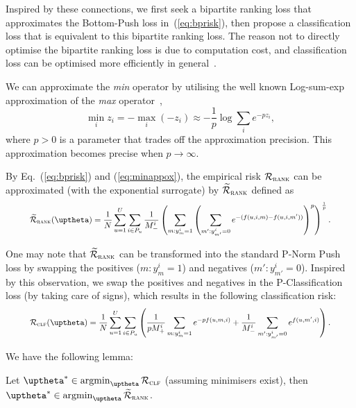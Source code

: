 Inspired by these connections, we first seek a bipartite ranking loss that approximates the Bottom-Push loss in~(\ref{eq:bprisk}),
then propose a classification loss that is equivalent to this bipartite ranking loss.
The reason not to directly optimise the bipartite ranking loss is due to computation cost,
and classification loss can be optimised more efficiently in general~\cite{ertekin2011equivalence}.

We can approximate the \emph{min} operator by utilising the well known Log-sum-exp approximation 
of the \emph{max} operator~\cite[p. 72]{boyd2004convex},
\begin{equation}
\label{eq:minappox}
\min_i z_i = -\max_i (-z_i) \approx -\frac{1}{p} \log \sum_i e^{-p z_i},
\end{equation}
where $p > 0$ is a parameter that trades off the approximation precision.
This approximation becomes precise when $p \to \infty$.

By Eq.~(\ref{eq:bprisk}) and (\ref{eq:minappox}), the empirical risk $\mathcal{R}_\textsc{rank}$ can be approximated
(with the exponential surrogate) by $\widetilde{\mathcal{R}}_\textsc{rank}$ defined as
\begin{equation}
\label{eq:rankapprox}
\resizebox{.9\linewidth}{!}{$
\begin{aligned}
\widetilde\RCal_\textsc{rank}(\uptheta)
= \frac{1}{N} \sum_{u=1}^U \sum_{i \in P_u} \frac{1}{M_-^i} \left( \sum_{m: y_m^i = 1} \left( \sum_{m': y_{m'}^i = 0} 
  e^{-(f(u, i, m) - f(u, i, m'))} \right)^p \right)^\frac{1}{p}.
\end{aligned}
$}
\end{equation}


One may note that $\widetilde{\mathcal{R}}_\textsc{rank}$ can be transformed into the standard P-Norm Push loss by swapping the
positives ($m: y_m^i = 1$) and negatives ($m': y_{m'}^i = 0$). %
Inspired by this observation, we swap the positives and negatives in the P-Classification loss (by taking care of signs),
which results in the following classification risk:
\begin{equation}
\label{eq:clfrisk}
\resizebox{.9\linewidth}{!}{$\displaystyle
\RCal_\textsc{clf}(\uptheta)
= \frac{1}{N} \sum_{u=1}^U \sum_{i \in P_u} \left(
  \frac{1}{p M_+^i} \sum_{m: y_m^i = 1} e^{-p f(u, m, i)}
  + \frac{1}{M_-^i} \sum_{m': y_{m'}^i = 0} e^{f(u, m', i)} \right).
$}
\end{equation}

We have the following lemma:
\begin{lemma}
\label{lm:rank2clf}
Let $\uptheta^* \in \argmin_{\uptheta} \RCal_\textsc{clf}$ (assuming minimisers exist),
then $\uptheta^* \in \argmin_{\uptheta} \widetilde\RCal_\textsc{rank}$.
\end{lemma}

